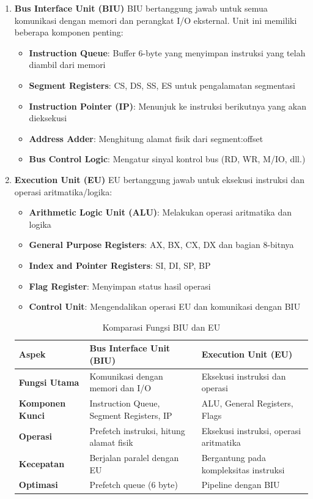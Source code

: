 \documentclass[../main.tex]{subfiles}
\begin{document}
\begin{enumerate}
\item \textbf{Bus Interface Unit (BIU)}
BIU bertanggung jawab untuk semua komunikasi dengan memori dan perangkat I/O eksternal. Unit ini memiliki beberapa komponen penting:

\begin{itemize}
    \item \textbf{Instruction Queue}: Buffer 6-byte yang menyimpan instruksi yang telah diambil dari memori
    \item \textbf{Segment Registers}: CS, DS, SS, ES untuk pengalamatan segmentasi
    \item \textbf{Instruction Pointer (IP)}: Menunjuk ke instruksi berikutnya yang akan dieksekusi
    \item \textbf{Address Adder}: Menghitung alamat fisik dari segment:offset
    \item \textbf{Bus Control Logic}: Mengatur sinyal kontrol bus (RD, WR, M/IO, dll.)
\end{itemize}

\item \textbf{Execution Unit (EU)}
EU bertanggung jawab untuk eksekusi instruksi dan operasi aritmatika/logika:

\begin{itemize}
    \item \textbf{Arithmetic Logic Unit (ALU)}: Melakukan operasi aritmatika dan logika
    \item \textbf{General Purpose Registers}: AX, BX, CX, DX dan bagian 8-bitnya
    \item \textbf{Index and Pointer Registers}: SI, DI, SP, BP
    \item \textbf{Flag Register}: Menyimpan status hasil operasi
    \item \textbf{Control Unit}: Mengendalikan operasi EU dan komunikasi dengan BIU
\end{itemize}

\begin{table}[h]
\centering
\caption{Komparasi Fungsi BIU dan EU}
\begin{tabular}{|p{3cm}|p{6cm}|p{6cm}|}
\hline
\textbf{Aspek} & \textbf{Bus Interface Unit (BIU)} & \textbf{Execution Unit (EU)} \\
\hline
\textbf{Fungsi Utama} & Komunikasi dengan memori dan I/O & Eksekusi instruksi dan operasi \\
\hline
\textbf{Komponen Kunci} & Instruction Queue, Segment Registers, IP & ALU, General Registers, Flags \\
\hline
\textbf{Operasi} & Prefetch instruksi, hitung alamat fisik & Eksekusi instruksi, operasi aritmatika \\
\hline
\textbf{Kecepatan} & Berjalan paralel dengan EU & Bergantung pada kompleksitas instruksi \\
\hline
\textbf{Optimasi} & Prefetch queue (6 byte) & Pipeline dengan BIU \\
\hline
\end{tabular}
\label{tab:biu-eu-comparison}
\end{table}


\end{enumerate}
\end{document}
